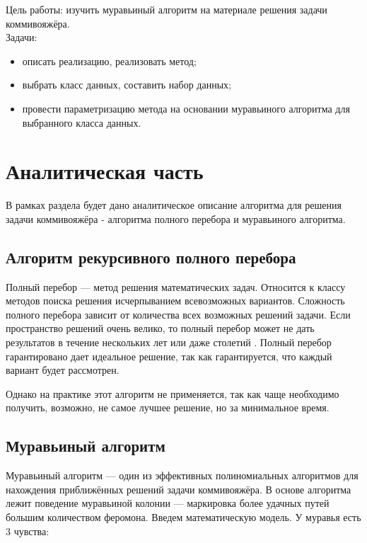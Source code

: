 \documentclass[a4paper,12pt]{report}
\begin{document}
		Цель работы: изучить муравьиный алгоритм на материале решения задачи коммивояжёра.\\
		
		Задачи:
		\begin{itemize}
			\item описать реализацию, реализовать метод;
			\item выбрать класс данных, составить набор данных;
			\item провести параметризацию метода на основании муравьиного алгоритма   для выбранного класса данных.
		\end{itemize}

    \label{sec:intro}

    \newpage

    \chapter{Аналитическая часть}
        \label{sec:analitic_part}

        	В рамках раздела будет дано аналитическое описание алгоритма для решения задачи коммивояжёра - алгоритма полного перебора и муравьиного алгоритма.
        	
	\section{Алгоритм рекурсивного полного перебора}

   			Полный перебор — метод решения математических задач. 
   			Относится к классу методов поиска решения исчерпыванием всевозможных вариантов. 
   			Сложность полного перебора зависит от количества всех возможных решений задачи. 
   			Если пространство решений очень велико, то полный перебор может не дать результатов в течение нескольких лет или даже столетий \cite{commi}. 
   			Полный перебор гарантировано дает идеальное решение, так как гарантируется, что каждый вариант будет рассмотрен.
   			
   			Однако на практике этот  алгоритм не применяется, так как чаще необходимо получить, возможно, не самое лучшее решение, но за минимальное время.

	\section{Муравьиный алгоритм}

   			Муравьиный алгоритм — один из эффективных полиномиальных алгоритмов для нахождения приближённых решений задачи коммивояжёра. 
   			В основе алгоритма лежит поведение муравьиной колонии — маркировка более удачных путей большим количеством феромона\cite{ant1}.
   			\newline
   			Введем математическую модель.
   			У муравья есть 3 чувства:
   			
\end{document}
